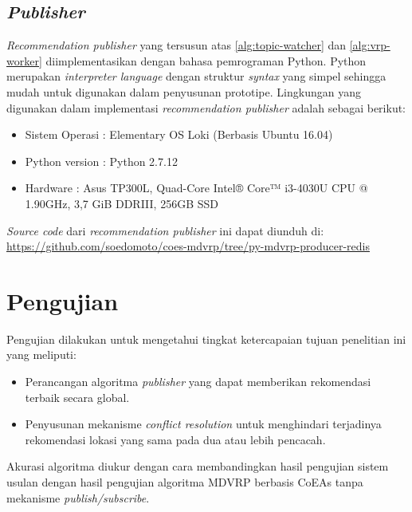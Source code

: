 \subsection{\textit{Publisher}}
\textit{Recommendation publisher} yang tersusun atas \autoref{alg:topic-watcher} dan \autoref{alg:vrp-worker} diimplementasikan dengan bahasa pemrograman Python. Python merupakan \textit{interpreter language} dengan struktur \textit{syntax} yang simpel sehingga mudah untuk digunakan dalam penyusunan prototipe. Lingkungan yang digunakan dalam implementasi \textit{recommendation publisher} adalah sebagai berikut:

\begin{itemize}
\item Sistem Operasi		: Elementary OS Loki (Berbasis Ubuntu 16.04)
\item Python version		: Python 2.7.12
\item Hardware				: Asus TP300L, Quad-Core Intel® Core™ i3-4030U CPU @ 1.90GHz, 3,7 GiB DDRIII, 256GB SSD
\end{itemize}

\textit{Source code} dari \textit{recommendation publisher} ini dapat diunduh di: \url{https://github.com/soedomoto/coes-mdvrp/tree/py-mdvrp-producer-redis}

\section{Pengujian}
\label{sec:testing}
Pengujian dilakukan untuk mengetahui tingkat ketercapaian tujuan penelitian ini yang meliputi:
\begin{itemize}
	\item Perancangan algoritma \textit{publisher} yang dapat memberikan rekomendasi terbaik secara global.
	\item Penyusunan mekanisme \textit{conflict resolution} untuk menghindari terjadinya rekomendasi lokasi yang sama pada dua atau lebih pencacah.
\end{itemize}

Akurasi algoritma diukur dengan cara membandingkan hasil pengujian sistem usulan dengan hasil pengujian algoritma MDVRP berbasis CoEAs tanpa mekanisme \textit{publish/subscribe}.


